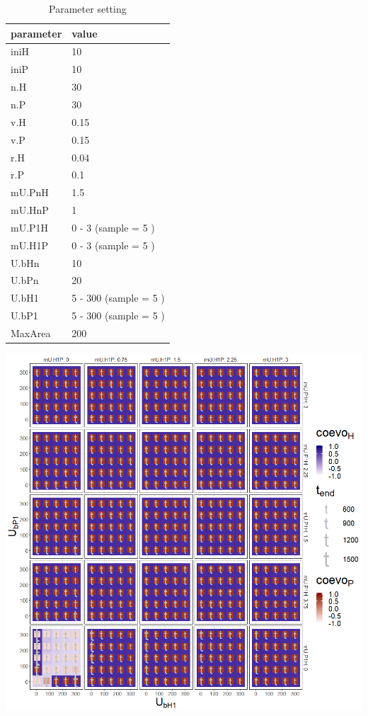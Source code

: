 \documentclass[]{book}
\begin{document}
\begin{table}[!h]

\caption{\label{tab:4Ub1mU1tablepdf}Parameter setting}
\centering
\begin{tabular}{l|l}
\hline
parameter & value\\
\hline
iniH & 10\\
\hline
iniP & 10\\
\hline
n.H & 30\\
\hline
n.P & 30\\
\hline
v.H & 0.15\\
\hline
v.P & 0.15\\
\hline
r.H & 0.04\\
\hline
r.P & 0.1\\
\hline
mU.PnH & 1.5\\
\hline
mU.HnP & 1\\
\hline
mU.P1H & 0 - 3 (sample = 5 )\\
\hline
mU.H1P & 0 - 3 (sample = 5 )\\
\hline
U.bHn & 10\\
\hline
U.bPn & 20\\
\hline
U.bH1 & 5 - 300 (sample = 5 )\\
\hline
U.bP1 & 5 - 300 (sample = 5 )\\
\hline
MaxArea & 200\\
\hline
\end{tabular}
\end{table}

\newpage

\includegraphics[width=1\linewidth]{plots/4_fourPar-U.b1-mU1_plot}
\end{document}
